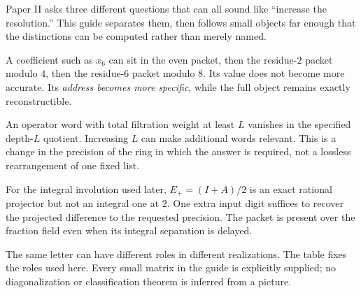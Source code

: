 
Paper II asks three different questions that can all sound like ``increase the resolution.'' This guide separates them, then follows small objects far enough that the distinctions can be computed rather than merely named.


A coefficient such as $x_6$ can sit in the even packet, then the residue-$2$ packet modulo $4$, then the residue-$6$ packet modulo $8$. Its value does not become more accurate. Its \emph{address becomes more specific}, while the full object remains exactly reconstructible.

An operator word with total filtration weight at least $L$ vanishes in the specified depth-$L$ quotient. Increasing $L$ can make additional words relevant. This is a change in the precision of the ring in which the answer is required, not a lossless rearrangement of one fixed list.

For the integral involution used later, $E_+=(I+A)/2$ is an exact rational projector but not an integral one at $2$. One extra input digit suffices to recover the projected difference to the requested precision. The packet is present over the fraction field even when its integral separation is delayed.


The same letter can have different roles in different realizations. The table fixes the roles used here. Every small matrix in the guide is explicitly supplied; no diagonalization or classification theorem is inferred from a picture.

